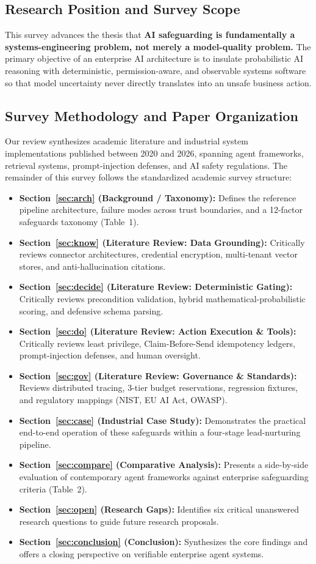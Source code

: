 \documentclass[10pt,a4paper,twocolumn]{article}
\begin{document}
\subsection{Research Position and Survey Scope}
This survey advances the thesis that \textbf{AI safeguarding is fundamentally a systems-engineering problem, not merely a model-quality problem.} The primary objective of an enterprise AI architecture is to insulate probabilistic AI reasoning with deterministic, permission-aware, and observable systems software so that model uncertainty never directly translates into an unsafe business action.

\subsection{Survey Methodology and Paper Organization}
Our review synthesizes academic literature and industrial system implementations published between 2020 and 2026, spanning agent frameworks, retrieval systems, prompt-injection defenses, and AI safety regulations. The remainder of this survey follows the standardized academic survey structure:
\begin{itemize}[leftmargin=*]
  \item \textbf{Section~\ref{sec:arch} (Background / Taxonomy):} Defines the reference pipeline architecture, failure modes across trust boundaries, and a 12-factor safeguards taxonomy (Table~1).
  \item \textbf{Section~\ref{sec:know} (Literature Review: Data Grounding):} Critically reviews connector architectures, credential encryption, multi-tenant vector stores, and anti-hallucination citations.
  \item \textbf{Section~\ref{sec:decide} (Literature Review: Deterministic Gating):} Critically reviews precondition validation, hybrid mathematical-probabilistic scoring, and defensive schema parsing.
  \item \textbf{Section~\ref{sec:do} (Literature Review: Action Execution \& Tools):} Critically reviews least privilege, Claim-Before-Send idempotency ledgers, prompt-injection defenses, and human oversight.
  \item \textbf{Section~\ref{sec:gov} (Literature Review: Governance \& Standards):} Reviews distributed tracing, 3-tier budget reservations, regression fixtures, and regulatory mappings (NIST, EU AI Act, OWASP).
  \item \textbf{Section~\ref{sec:case} (Industrial Case Study):} Demonstrates the practical end-to-end operation of these safeguards within a four-stage lead-nurturing pipeline.
  \item \textbf{Section~\ref{sec:compare} (Comparative Analysis):} Presents a side-by-side evaluation of contemporary agent frameworks against enterprise safeguarding criteria (Table~2).
  \item \textbf{Section~\ref{sec:open} (Research Gaps):} Identifies six critical unanswered research questions to guide future research proposals.
  \item \textbf{Section~\ref{sec:conclusion} (Conclusion):} Synthesizes the core findings and offers a closing perspective on verifiable enterprise agent systems.
\end{itemize}
\end{document}
